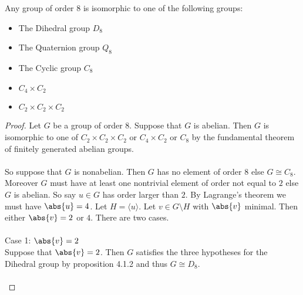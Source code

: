\documentclass[a4paper]{article}
\begin{document}
\begin{thm}{}{} Any group of order $8$ is isomorphic to one of the following groups: 
\begin{itemize}
\item The Dihedral group $D_8$
\item The Quaternion group $Q_8$
\item The Cyclic group $C_8$
\item $C_4\times C_2$
\item $C_2\times C_2\times C_2$
\end{itemize} \tcbline
\begin{proof}
Let $G$ be a group of order $8$. Suppose that $G$ is abelian. Then $G$ is isomorphic to one of $C_2\times C_2\times C_2$ or $C_4\times C_2$ or $C_8$ by the fundamental theorem of finitely generated abelian groups. \\~\\
So suppose that $G$ is nonabelian. Then $G$ has no element of order $8$ else $G\cong C_8$. Moreover $G$ must have at least one nontrivial element of order not equal to $2$ else $G$ is abelian. So say $u\in G$ has order larger than $2$. By Lagrange's theorem we must have $\abs{u}=4$. Let $H=\langle u\rangle$. Let $v\in G\setminus H$ with $\abs{v}$ minimal. Then either $\abs{v}=2$ or $4$. There are two cases. \\~\\

Case 1: $\abs{v}=2$\\
Suppose that $\abs{v}=2$. Then $G$ satisfies the three hypotheses for the Dihedral group by proposition 4.1.2 and thus $G\cong D_8$. \\~\\


\end{proof}
\end{thm}
\end{document}
